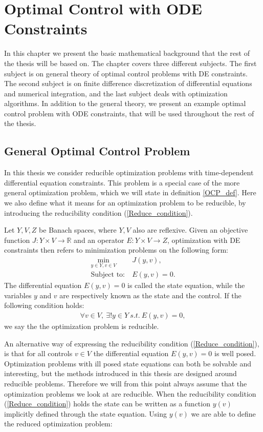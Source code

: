 \chapter{Optimal Control with ODE Constraints} \label{math_chap}
In this chapter we present the basic mathematical background that the rest of the thesis will be based on. The chapter covers three different subjects. The first subject is on general theory of optimal control problems with DE constraints. The second subject is on finite difference discretization of differential equations and numerical integration, and the last subject deals with optimization algorithms. In addition to the general theory, we present an example optimal control problem with ODE constraints, that will be used throughout the rest of the thesis. 
 \section{General Optimal Control Problem}
In this thesis we consider reducible optimization problems with time-dependent differential equation constraints. This problem is a special case of the more general optimization problem, which we will state in definition \ref{OCP_def}. Here we also define what it means for an optimization problem to be reducible, by introducing the reducibility condition (\ref{Reduce_condition}).
\begin{definition} \label{OCP_def}
Let $Y,V,Z$ be Banach spaces, where $Y,V$ also are reflexive. Given an objective function $J: Y\times V\rightarrow\mathbb{R}$ and an operator $E:Y\times V \rightarrow Z$, optimization with DE constraints then refers to minimization problems on the following form:
\begin{align}
\underset{y\in Y,v\in V}{\text{min}} \ &J(y,v), \label{OCP_DEF_J}\\
\textrm{Subject to:} \ &E(y,v)=0. \label{OCP_DEF_E}
\end{align}
The differential equation $E(y,v)=0$ is called the state equation, while the variables $y$ and $v$ are respectively known as the state and the control. If the following condition holds:
\begin{align}
\forall v \in V, \ \exists! y \in Y \ s.t. \ E(y,v)=0, \label{Reduce_condition}
\end{align}
we say the the optimization problem is reducible.
\end{definition}
\noindent
An alternative way of expressing the reducibility condition (\ref{Reduce_condition}), is that for all controls $v\in V$ the differential equation $E(y,v)=0$ is well posed. Optimization problems with ill posed state equations can both be solvable and interesting, but the methods introduced in this thesis are designed around reducible problems. Therefore we will from this point always assume that the optimization problems we look at are reducible. When the reducibility condition (\ref{Reduce_condition}) holds the state can be written as a function $y(v)$ implicitly defined through the state equation. Using $y(v)$ we are able to define the reduced optimization problem:
